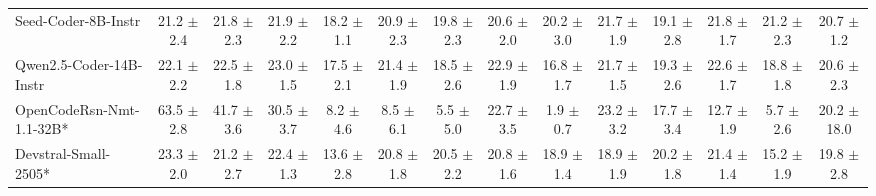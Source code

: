 \begin{table}[hbt]
{\begin{tabular}{l *{13}{c}}




\rowcolor{gray!10}
Seed-Coder-8B-Instr 
 & 21.2 {\tiny$\pm$ 2.4} &
 21.8 {\tiny$\pm$ 2.3} &
 21.9 {\tiny$\pm$ 2.2} &
 18.2 {\tiny$\pm$ 1.1} &
 20.9 {\tiny$\pm$ 2.3} &
 19.8 {\tiny$\pm$ 2.3} &
 20.6 {\tiny$\pm$ 2.0} &
 20.2 {\tiny$\pm$ 3.0} &
 21.7 {\tiny$\pm$ 1.9} &
 19.1 {\tiny$\pm$ 2.8} &
 21.8 {\tiny$\pm$ 1.7} &
 21.2 {\tiny$\pm$ 2.3} &
 20.7 {\tiny$\pm$ 1.2} \\

 Qwen2.5-Coder-14B-Instr &
22.1 {\tiny$\pm$ 2.2} &
22.5 {\tiny$\pm$ 1.8} &
23.0 {\tiny$\pm$ 1.5} &
17.5 {\tiny$\pm$ 2.1} &
21.4 {\tiny$\pm$ 1.9} &
18.5 {\tiny$\pm$ 2.6} &
22.9 {\tiny$\pm$ 1.9} &
16.8 {\tiny$\pm$ 1.7} &
21.7 {\tiny$\pm$ 1.5} &
19.3 {\tiny$\pm$ 2.6} &
22.6 {\tiny$\pm$ 1.7} &
18.8 {\tiny$\pm$ 1.8} &
20.6 {\tiny$\pm$ 2.3} \\




\rowcolor{gray!10}
 OpenCodeRsn-Nmt-1.1-32B* &
63.5 {\tiny$\pm$ 2.8} &
41.7 {\tiny$\pm$ 3.6} &
30.5 {\tiny$\pm$ 3.7} &
8.2 {\tiny$\pm$ 4.6} &
8.5 {\tiny$\pm$ 6.1} &
5.5 {\tiny$\pm$ 5.0} &
22.7 {\tiny$\pm$ 3.5} &
1.9 {\tiny$\pm$ 0.7} &
23.2 {\tiny$\pm$ 3.2} &
17.7 {\tiny$\pm$ 3.4} &
12.7 {\tiny$\pm$ 1.9} &
5.7 {\tiny$\pm$ 2.6} &
20.2 {\tiny$\pm$ 18.0} \\


Devstral-Small-2505* &
23.3 {\tiny$\pm$ 2.0} &
21.2 {\tiny$\pm$ 2.7} &
22.4 {\tiny$\pm$ 1.3} &
13.6 {\tiny$\pm$ 2.8} &
20.8 {\tiny$\pm$ 1.8} &
20.5 {\tiny$\pm$ 2.2} &
20.8 {\tiny$\pm$ 1.6} &
18.9 {\tiny$\pm$ 1.4} &
18.9 {\tiny$\pm$ 1.9} &
20.2 {\tiny$\pm$ 1.8} &
21.4 {\tiny$\pm$ 1.4} &
15.2 {\tiny$\pm$ 1.9} &
19.8 {\tiny$\pm$ 2.8} \\


\end{tabular}}
\end{table}
